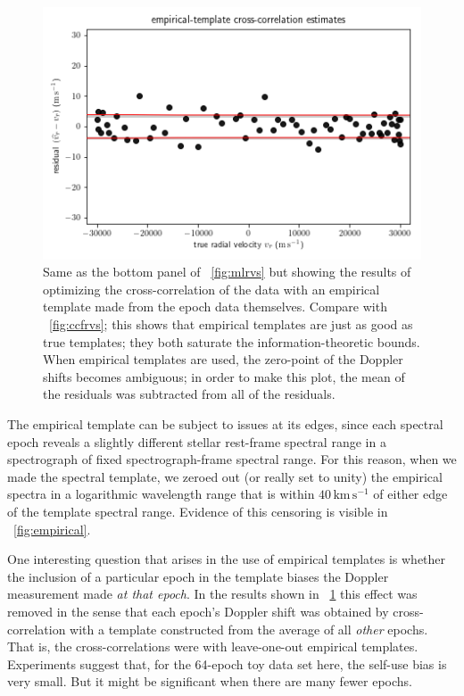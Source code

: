 \documentclass[modern]{aastex631}
\newcommand{\unit}[1]{\mathrm{#1}}
\newcommand{\km}{\unit{km}}
\newcommand{\s}{\unit{s}}
\newcommand{\kmps}{\km\,\s^{-1}}
\newcommand{\figref}[1]{\figurename~\ref{#1}}
\begin{document}
\begin{figure}[tp]
  \begin{mdframed}
    \begin{center}
    \includegraphics[width=\textwidth]{../notebook/empiricalrvs.png}
    \end{center}
    \caption{Same as the bottom panel of \figref{fig:mlrvs} but showing the results of optimizing the cross-correlation of the data with an empirical template made from the epoch data themselves. Compare with \figref{fig:ccfrvs}; this shows that empirical templates are just as good as true templates; they both saturate the information-theoretic bounds. When empirical templates are used, the zero-point of the Doppler shifts becomes ambiguous; in order to make this plot, the mean of the residuals was subtracted from all of the residuals.\label{fig:empiricalrvs}}
  \end{mdframed}
\end{figure}

The empirical template can be subject to issues at its edges, since each spectral epoch reveals a slightly different stellar rest-frame spectral range in a spectrograph of fixed spectrograph-frame spectral range.
For this reason, when we made the spectral template, we zeroed out (or really set to unity) the empirical spectra in a logarithmic wavelength range that is within $40\,\kmps$ of either edge of the template spectral range.
Evidence of this censoring is visible in \figref{fig:empirical}.

One interesting question that arises in the use of empirical templates is whether the inclusion of a particular epoch in the template biases the Doppler measurement made \emph{at that epoch}.
In the results shown in \figref{fig:empiricalrvs} this effect was removed in the sense that each epoch's Doppler shift was obtained by cross-correlation with a template constructed from the average of all \emph{other} epochs.
That is, the cross-correlations were with leave-one-out empirical templates.
Experiments suggest that, for the 64-epoch toy data set here, the self-use bias is very small.
But it might be significant when there are many fewer epochs.
\end{document}
